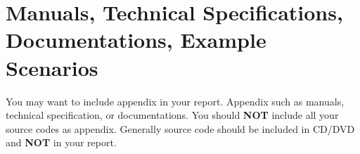 \chapter{Manuals, Technical Specifications, Documentations, Example Scenarios}

You may want to include appendix in your report. Appendix such as manuals, technical specification, or documentations. You should \textbf{NOT} include all your source codes as appendix. Generally source code should be included in CD/DVD and \textbf{NOT} in your report.
